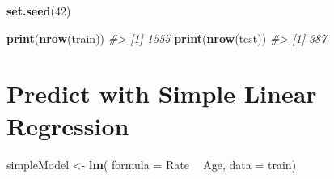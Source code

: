 \documentclass[]{book}
\newenvironment{Shaded}{\begin{snugshade}}{\end{snugshade}}
\newcommand{\CommentTok}[1]{\textcolor[rgb]{0.56,0.35,0.01}{\textit{#1}}}
\newcommand{\DataTypeTok}[1]{\textcolor[rgb]{0.13,0.29,0.53}{#1}}
\newcommand{\DecValTok}[1]{\textcolor[rgb]{0.00,0.00,0.81}{#1}}
\newcommand{\FloatTok}[1]{\textcolor[rgb]{0.00,0.00,0.81}{#1}}
\newcommand{\KeywordTok}[1]{\textcolor[rgb]{0.13,0.29,0.53}{\textbf{#1}}}
\newcommand{\NormalTok}[1]{#1}
\newcommand{\OperatorTok}[1]{\textcolor[rgb]{0.81,0.36,0.00}{\textbf{#1}}}
\newcommand{\OtherTok}[1]{\textcolor[rgb]{0.56,0.35,0.01}{#1}}
\newcommand{\StringTok}[1]{\textcolor[rgb]{0.31,0.60,0.02}{#1}}
\begin{document}
\begin{Shaded}
\begin{Highlighting}[]
\KeywordTok{set.seed}\NormalTok{(}\DecValTok{42}\NormalTok{)}
\end{Highlighting}
\end{Shaded}

\begin{Shaded}
\end{Shaded}

\begin{Shaded}
\begin{Highlighting}[]
\KeywordTok{print}\NormalTok{(}\KeywordTok{nrow}\NormalTok{(train))}
\CommentTok{#> [1] 1555}
\KeywordTok{print}\NormalTok{(}\KeywordTok{nrow}\NormalTok{(test))}
\CommentTok{#> [1] 387}
\end{Highlighting}
\end{Shaded}

\hypertarget{predict-with-simple-linear-regression-1}{%
\section{Predict with Simple Linear Regression}\label{predict-with-simple-linear-regression-1}}

\begin{Shaded}
\begin{Highlighting}[]
\NormalTok{simpleModel <-}\StringTok{ }\KeywordTok{lm}\NormalTok{(}
  \DataTypeTok{formula =}\NormalTok{ Rate }\OperatorTok{~}\StringTok{ }\NormalTok{Age,}
  \DataTypeTok{data =}\NormalTok{ train)}
\end{Highlighting}
\end{Shaded}
\end{document}
